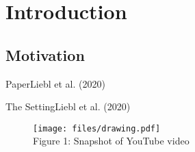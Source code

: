\section{Introduction}


\subsection{Motivation}

\begin{frame}{Paper}{Liebl et al. (2020)}
\begin{figure}[ht]
    \centering
    \vspace{-0.8cm}
\end{figure}
\end{frame}

\begin{frame}{The Setting}{Liebl et al. (2020)}
\begin{figure}[ht]
    \centering
    \vspace{-1cm}
    \texttt{[image: files/drawing.pdf]}
    \\[0.5em]
    \hspace{7.7cm} \footnotesize Figure 1: Snapshot of YouTube video
\end{figure}
\end{frame}

